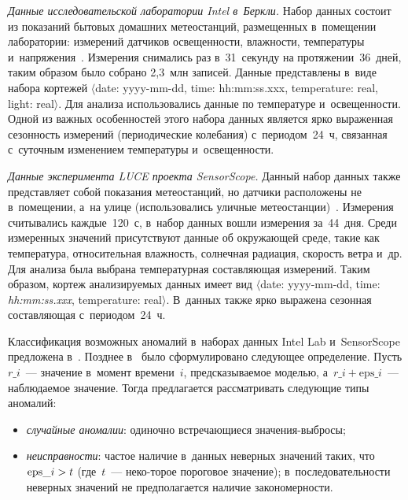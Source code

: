 \begin{multicols}{2}
      \textit{Данные исследовательской лаборатории Intel в~Беркли.} Набор 
данных состоит из показаний бытовых домашних метеостанций, размещенных в~помещении лаборатории: измерений датчиков освещенности, влажности, 
температуры и~напряжения~\cite{6-st}. Измерения снимались раз в~31~секунду 
на протяжении~36~дней, таким образом было собрано 2,3~млн записей. 
Данные представлены в~виде набора кортежей $\langle${date}:  
{yyyy-mm-dd}, {time}: {hh:mm:ss.xxx}, {temperature}: 
{real}, {light}: {real}$\rangle$. Для анализа использовались 
данные по температуре и~освещенности. Одной из важных особенностей этого 
набора данных является ярко выраженная сезонность измерений 
(периодические колебания) с~периодом~24~ч, связанная с~суточным 
изменением температуры и~освещенности.
      
      \textit{Данные эксперимента LUCE проекта SensorScope.} Данный 
набор данных также представляет собой показания метеостанций, но датчики 
расположены не в~помещении, а~на улице (использовались уличные 
метеостанции)~\cite{7-st}. Измерения считывались каждые~120~с, 
в~набор данных вошли измерения за~44~дня. Среди измеренных значений 
присутствуют данные об окружающей среде, такие как температура, 
относительная влажность, солнечная радиация, скорость ветра и~др. Для 
анализа была выбрана температурная составляющая измерений. Таким 
образом, кортеж анализируемых данных имеет вид $\langle${date}:  
{yyyy-mm-dd}, {time}: \textit{hh:mm:ss.xxx}, {temperature}: 
{real}$\rangle$. В~данных также ярко выражена сезонная составляющая 
с~периодом~24~ч.
      
      Классификация возможных аномалий в~наборах данных Intel Lab 
и~SensorScope предложена в~\cite{8-st}. Позднее в~\cite{9-st} было 
сформулировано сле\-ду\-ющее определение. Пусть $r\_i$~--- значение в~момент 
времени~$i$, предсказываемое моделью, а~$r\_i + \mathrm{eps}\_i$~--- наблюдаемое 
значение. Тогда предлагается рас\-смат\-ри\-вать сле\-ду\-ющие типы аномалий: 
      \begin{itemize}
\item \textit{случайные аномалии}: одиночно встречающиеся зна\-че\-ния-выбросы;
\item \textit{неисправности}: частое наличие в~данных не\-вер\-ных значений 
таких, что $\mathrm{eps}\_i \hm> t$ (где~$t$~--- неко-\linebreak торое пороговое значение); 
в~последовательности неверных значений не предполагается наличие 
закономерности.
\end{itemize}
      

\end{multicols}
